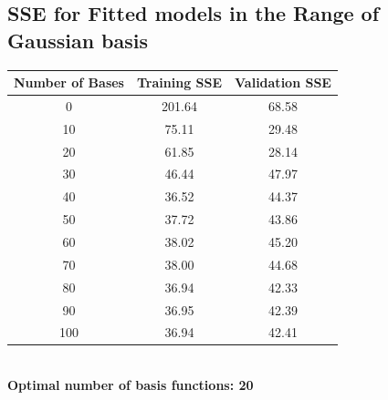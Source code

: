 \documentclass{article}
\begin{document}
\begin{appendices}
\subsection{SSE for Fitted models in the Range of Gaussian
basis} \label{app:loss-history-sgd-log}
\begin{minipage}{0.5\textwidth}  %
        \centering
        \begin{tabular}{|c|c|c|}
            \hline
            {Number of Bases} & {Training SSE} & {Validation SSE} \\
            \hline
             0  & 201.64  & 68.58  \\
            10  &  75.11  & 29.48  \\
            20  &  61.85  & 28.14  \\
            30  &  46.44  & 47.97  \\
            40  &  36.52  & 44.37  \\
            50  &  37.72  & 43.86  \\
            60  &  38.02  & 45.20  \\
            70  &  38.00  & 44.68  \\
            80  &  36.94  & 42.33  \\
            90  &  36.95  & 42.39  \\
           100  &  36.94  & 42.41  \\
            \hline
        \end{tabular}\\
        \vspace{0.3cm}
        \textbf{Optimal number of basis functions: 20}
        \label{SSE_table}
    \end{minipage}


\end{appendices}
\end{document}
